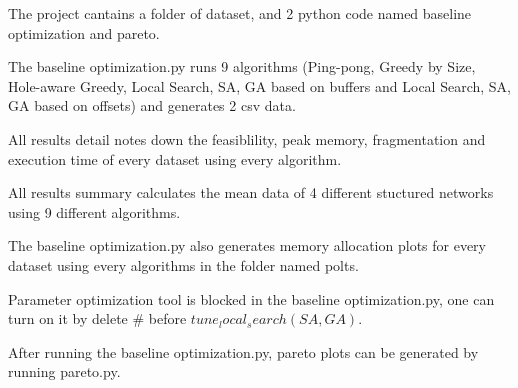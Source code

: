 \singlespacing
The project cantains a folder of dataset, and 2 python code named baseline optimization and pareto.

The baseline optimization.py runs 9 algorithms (Ping-pong, Greedy by Size, Hole-aware Greedy, Local Search, SA, GA based on buffers and Local Search, SA, GA based on offsets) and generates 2 csv data.

All results detail notes down the feasiblility, peak memory, fragmentation and execution time of every dataset using every algorithm.

All results summary calculates the mean data of 4 different stuctured networks using 9 different algorithms.

The baseline optimization.py also generates memory allocation plots for every dataset using every algorithms in the folder named polts.

Parameter optimization tool is blocked in the baseline optimization.py, one can turn on it by delete \# before $tune_local_search(SA,GA)$.

After running the baseline optimization.py, pareto plots can be generated by running pareto.py.
